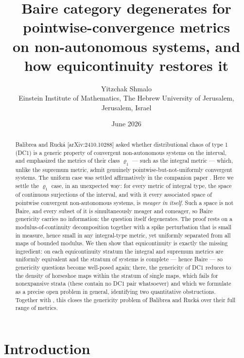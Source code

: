 \documentclass[11pt]{article}
\title{Baire category degenerates for pointwise-convergence metrics\\
on non-autonomous systems, and how equicontinuity restores it}
\author{Yitzchak Shmalo\\
\small Einstein Institute of Mathematics, The Hebrew University of Jerusalem, Jerusalem, Israel\\
\small }
\date{June 2026}
\begin{document}
\maketitle

\begin{abstract}
Balibrea and Ruck\'a [arXiv:2410.10288] asked whether distributional chaos of type 1
(DC1) is a generic property of convergent non-autonomous systems on the interval,
and emphasized the metrics of their class $\varrho_1$ --- such as the integral
metric --- which, unlike the supremum metric, admit genuinely
pointwise-but-not-uniformly convergent systems.  The uniform case was settled
affirmatively in the companion paper \cite{companion}.  Here we settle the
$\varrho_1$ case, in an unexpected way: for every metric of integral type, the space
of continuous surjections of the interval, and with it every associated space of
pointwise convergent non-autonomous systems, is \emph{meager in itself}.  Such a
space is not Baire, and every subset of it is simultaneously meager and comeager,
so Baire genericity carries no information: the question itself degenerates.  The
proof rests on a modulus-of-continuity decomposition together with a spike
perturbation that is small in measure, hence small in any integral-type metric, yet
uniformly separated from all maps of bounded modulus.  We then show that
equicontinuity is exactly the missing ingredient: on each equicontinuity stratum
the integral and supremum metrics are uniformly equivalent and the stratum of
systems is complete --- hence Baire --- so genericity questions become
well-posed again; there, the genericity of DC1 reduces to the density of
horseshoe maps within the stratum of single maps, which fails for nonexpansive
strata (these contain no DC1 pair whatsoever) and which we formulate as a
precise open problem in general, identifying two quantitative obstructions.
Together with \cite{companion}, this closes the genericity problem of Balibrea and
Ruck\'a over their full range of metrics.
\end{abstract}

\section{Introduction}\label{sec:intro}
\end{document}

